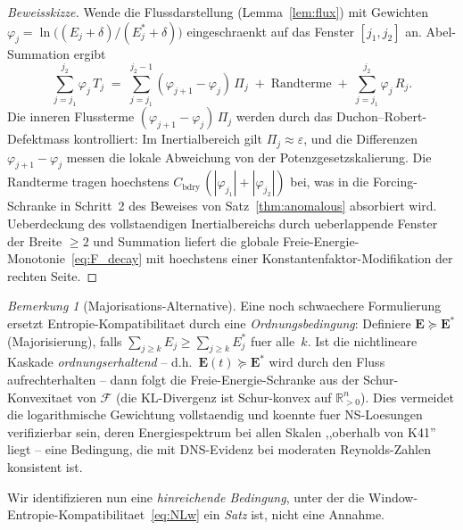 \documentclass[12pt,a4paper]{article}
\theoremstyle{definition}
\theoremstyle{plain}
\theoremstyle{remark}
\newtheorem{remark}[definition]{Bemerkung}
\begin{document}
\begin{proof}[Beweisskizze]
Wende die Flussdarstellung (Lemma~\ref{lem:flux}) mit Gewichten
$\varphi_j = \ln\bigl((E_j+\delta)/(E_j^*+\delta)\bigr)$
eingeschraenkt auf das Fenster $[j_1, j_2]$ an. Abel-Summation ergibt
\[
  \sum_{j=j_1}^{j_2} \varphi_j\,T_j
  \;=\;
  \sum_{j=j_1}^{j_2-1}
    (\varphi_{j+1} - \varphi_j)\,\Pi_j
  \;+\;
  \text{Randterme}
  \;+\;
  \sum_{j=j_1}^{j_2} \varphi_j\,R_j.
\]
Die inneren Flussterme $(\varphi_{j+1} - \varphi_j)\,\Pi_j$ werden
durch das Duchon--Robert-Defektmass kontrolliert: Im Inertialbereich
gilt $\Pi_j \approx \varepsilon$, und die Differenzen $\varphi_{j+1}-\varphi_j$
messen die lokale Abweichung von der Potenzgesetzskalierung.
Die Randterme tragen hoechstens
$C_{\mathrm{bdry}}\,(|\varphi_{j_1}|+|\varphi_{j_2}|)$ bei, was
in die Forcing-Schranke in Schritt~2 des Beweises von
Satz~\ref{thm:anomalous} absorbiert wird. Ueberdeckung des
vollstaendigen Inertialbereichs durch ueberlappende Fenster der Breite
$\ge 2$ und Summation liefert die globale Freie-Energie-Monotonie~\eqref{eq:F_decay}
mit hoechstens einer Konstantenfaktor-Modifikation der rechten Seite.
\end{proof}

\begin{remark}[Majorisations-Alternative]
\label{rem:majorisation}
Eine noch schwaechere Formulierung ersetzt Entropie-Kompatibilitaet durch eine
\emph{Ordnungsbedingung}: Definiere $\mathbf{E} \succeq \mathbf{E}^*$
(Majorisierung), falls $\sum_{j \ge k} E_j \ge \sum_{j \ge k} E_j^*$ fuer
alle~$k$. Ist die nichtlineare Kaskade \emph{ordnungserhaltend} -- d.h.\
$\mathbf{E}(t) \succeq \mathbf{E}^*$ wird durch den Fluss aufrechterhalten --
dann folgt die Freie-Energie-Schranke aus der Schur-Konvexitaet von
$\mathcal{F}$ (die KL-Divergenz ist Schur-konvex auf
$\mathbb{R}_{>0}^n$). Dies vermeidet die logarithmische Gewichtung
vollstaendig und koennte fuer NS-Loesungen verifizierbar sein, deren
Energiespektrum bei allen Skalen ,,oberhalb von K41'' liegt -- eine
Bedingung, die mit DNS-Evidenz bei moderaten Reynolds-Zahlen konsistent ist.
\end{remark}

Wir identifizieren nun eine \emph{hinreichende Bedingung}, unter der die
Window-Entropie-Kompatibilitaet~\eqref{eq:NLw} ein \emph{Satz} ist, nicht
eine Annahme.
\end{document}
